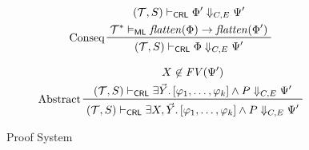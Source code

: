 \begin{figure}
\begin{align*}
    & \prftree[l]{Conseq}
      { \prfStackPremises
        { (\mathcal{T}, S) \vdash_\CRL \Phi^\prime \Downarrow_{C, E} \Psi^\prime}
        { \mathcal{T}^* \vDash_\ML \mathit{flatten}(\Phi) \rightarrow \mathit{flatten}(\Phi^\prime) }
      }
      { (\mathcal{T}, S) \vdash_\CRL \Phi \Downarrow_{C, E} \Psi^\prime}
    \end{align*}

    
    \begin{align*}
    & \prftree[l]{Abstract}
      { \prfStackPremises
        { X \not\in \mathit{FV}(\Psi^\prime)
        }
        {(\mathcal{T}, S) \vdash_\CRL \exists \vec{Y}.\, [\varphi_1, \ldots, \varphi_k] \land P \Downarrow_{C, E} \Psi^\prime}
      }
      {(\mathcal{T}, S) \vdash_\CRL \exists X, \vec{Y}.\, [\varphi_1, \ldots, \varphi_k] \land P \Downarrow_{C, E} \Psi^\prime}
    \end{align*}
    \caption{Proof System}
    \label{fig:CRLproofsystem}
\end{figure}

